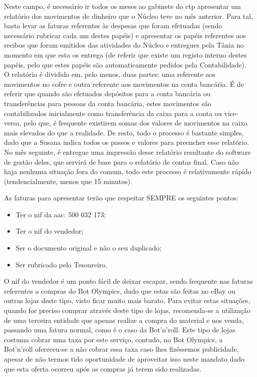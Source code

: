 Neste campo, é necessário ir todos os meses ao gabinete do \acrshort{ctp} apresentar um relatório dos movimentos de dinheiro que o Núcleo teve no mês anterior. Para tal, basta levar as faturas referentes às despesas que foram efetuadas (sendo necessário rubricar cada um destes papéis) e apresentar os papéis referentes aos recibos que foram emitidos das atividades do Núcleo e entregues pela Tânia no momento em que esta os entrega (de referir que existe um registo interno destes papéis, pelo que estes papéis são automaticamente pedidos pela Contabilidade). O relatório é dividido em, pelo menos, duas partes: uma referente aos movimentos no cofre e outra referente aos movimentos na conta bancária. É de referir que quando são efetuados depósitos para a conta bancária ou transferências para pessoas da conta bancária, estes movimentos são contabilizados inicialmente como transferência da caixa para a conta ou vice-versa, pelo que, é frequente existirem somas dos valores de movimentos na caixa mais elevados do que a realidade. De resto, todo o processo é bastante simples, dado que a Susana indica todos os passos e valores para preencher esse relatório. No mês seguinte, é entregue uma impressão desse relatório resultante do software de gestão deles, que servirá de base para o relatório de contas final. Caso não haja nenhuma situação fora do comum, todo este processo é relativamente rápido (tendencialmente, menos que 15 minutos).

As faturas para apresentar terão que respeitar SEMPRE os seguintes pontos:
\begin{itemize}
    \item Ter o \acrshort{nif} da \acrshort{aac}: 500 032 173;
    \item Ter o \acrshort{nif} do vendedor;
    \item Ser o documento original e não o seu duplicado;
    \item Ser rubricado pelo Tesoureiro.
\end{itemize}

O \acrshort{nif} do vendedor é um ponto fácil de deixar escapar, sendo frequente nas faturas referentes a compras do Bot Olympics, dado que estas são feitas no eBay ou outras lojas deste tipo, visto ficar muito mais barato. Para evitar estas situações, quando for preciso comprar através deste tipo de lojas, recomenda-se a utilização de uma terceira entidade que apenas realize a compra do material e nos venda, passando uma fatura normal, como é o caso da Bot'n'roll. Este tipo de lojas costuma cobrar uma taxa por este serviço, contudo, no Bot Olympics, a Bot'n'roll ofereceu-se a não cobrar essa taxa caso lhes fizéssemos publicidade, apesar de não termos tido oportunidade de aproveitar isso neste mandato dado que esta oferta ocorreu após as compras já terem sido realizadas.

